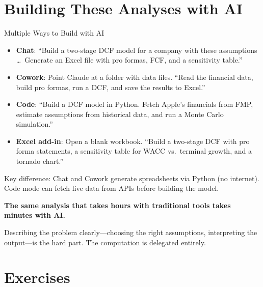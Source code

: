 \documentclass[aspectratio=169]{beamer}
\begin{document}
\section{Building These Analyses with AI}

\begin{frame}{Multiple Ways to Build with AI}
\begin{itemize}
  \item \textbf{Chat}: ``Build a two-stage DCF model for a company with these assumptions \ldots\ Generate an Excel file with pro formas, FCF, and a sensitivity table.''
  \item \textbf{Cowork}: Point Claude at a folder with data files. ``Read the financial data, build pro formas, run a DCF, and save the results to Excel.''
  \item \textbf{Code}: ``Build a DCF model in Python. Fetch Apple's financials from FMP, estimate assumptions from historical data, and run a Monte Carlo simulation.''
  \item \textbf{Excel add-in}: Open a blank workbook. ``Build a two-stage DCF with pro forma statements, a sensitivity table for WACC vs.\ terminal growth, and a tornado chart.''
\end{itemize}
\vspace{0.2cm}
\alert{Key difference:} Chat and Cowork generate spreadsheets via Python (no internet).  Code mode can \alert{fetch live data} from APIs before building the model.
\end{frame}

\begin{frame}{}
\vspace{2cm}
\begin{center}
{\Large\bfseries The same analysis that takes hours with traditional tools takes minutes with AI.}

\vspace{1cm}
Describing the problem clearly---choosing the right assumptions, interpreting the output---is the hard part.  The computation is delegated entirely.
\end{center}
\end{frame}

\section{Exercises}
\end{document}
